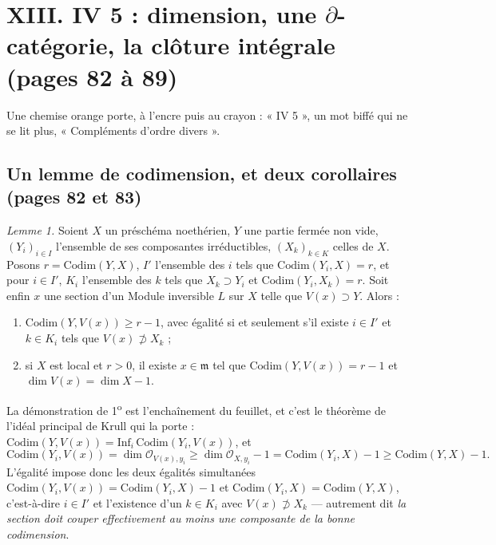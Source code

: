 \documentclass[11pt,a4paper]{article}
\begin{document}
\section*{XIII. IV 5 : dimension, une $\partial$-catégorie, la clôture intégrale (pages 82 à 89)}

Une chemise orange porte, à l'encre puis au crayon : « IV 5 », un mot biffé qui
ne se lit plus, « Compléments d'ordre divers ».

\subsection*{Un lemme de codimension, et deux corollaires (pages 82 et 83)}

\emph{Lemme 1.} Soient $X$ un préschéma noethérien, $Y$ une partie fermée non
vide, $(Y_{i})_{i \in I}$ l'ensemble de ses composantes irréductibles,
$(X_{k})_{k \in K}$ celles de $X$. Posons $r = \mathrm{Codim}(Y, X)$, $I'$
l'ensemble des $i$ tels que $\mathrm{Codim}(Y_{i}, X) = r$, et pour $i \in I'$,
$K_{i}$ l'ensemble des $k$ tels que $X_{k} \supset Y_{i}$ et
$\mathrm{Codim}(Y_{i}, X_{k}) = r$. Soit enfin $x$ une section d'un Module
inversible $L$ sur $X$ telle que $V(x) \supset Y$. Alors :

\begin{enumerate}
  \item[1\textsuperscript{o})] $\mathrm{Codim}(Y, V(x)) \geqslant r - 1$, avec
  égalité si et seulement s'il existe $i \in I'$ et $k \in K_{i}$ tels que
  $V(x) \not\supset X_{k}$ ;
  \item[2\textsuperscript{o})] si $X$ est local et $r > 0$, il existe $x \in
  \mathfrak{m}$ tel que $\mathrm{Codim}(Y, V(x)) = r - 1$ et $\dim V(x) = \dim X
  - 1$.
\end{enumerate}

La démonstration de 1\textsuperscript{o} est l'enchaînement du feuillet, et
c'est le théorème de l'idéal principal de Krull qui la porte :
$\mathrm{Codim}(Y, V(x)) = \mathrm{Inf}_{i}\, \mathrm{Codim}(Y_{i}, V(x))$, et
\[
  \mathrm{Codim}(Y_{i}, V(x)) = \dim \mathcal{O}_{V(x), y_{i}}
  \geqslant \dim \mathcal{O}_{X, y_{i}} - 1 = \mathrm{Codim}(Y_{i}, X) - 1
  \geqslant \mathrm{Codim}(Y, X) - 1 .
\]
L'égalité impose donc les deux égalités simultanées
$\mathrm{Codim}(Y_{i}, V(x)) = \mathrm{Codim}(Y_{i}, X) - 1$ et
$\mathrm{Codim}(Y_{i}, X) = \mathrm{Codim}(Y, X)$, c'est-à-dire $i \in I'$ et
l'existence d'un $k \in K_{i}$ avec $V(x) \not\supset X_{k}$ — autrement dit
\emph{la section doit couper effectivement au moins une composante de la bonne
codimension}.
\end{document}
